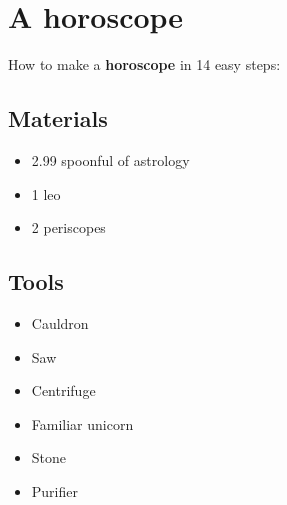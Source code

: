 \documentclass{article}
\begin{document}
\section{A horoscope}How to make a \textbf{horoscope} in 14 easy steps:

\subsection{Materials}\begin{itemize}
\item 
2.99 spoonful of astrology
\item 
1 leo
\item 
2 periscopes
\end{itemize}
\subsection{Tools}\begin{itemize}
\item 
Cauldron
\item 
Saw
\item 
Centrifuge
\item 
Familiar unicorn
\item 
Stone
\item 
Purifier
\end{itemize}
\end{document}

